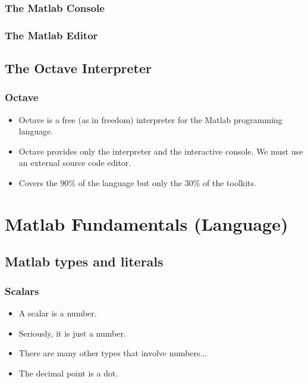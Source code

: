 \documentclass[12pt]{beamer}
\begin{document}
\begin{frame}
  \frametitle{The Matlab Console}


\end{frame}

\begin{frame}
  \frametitle{The Matlab Editor}

\end{frame}

\subsection{The Octave Interpreter}
\begin{frame}
  \frametitle{Octave}
  \begin{itemize}
  \item Octave is a free (as in freedom) interpreter for the Matlab
    programming language.
  \item Octave provides only the interpreter and the interactive
    console. We must use an external source code editor.
  \item Covers the 90\% of the language but only the 30\% of the
    toolkits.
  \end{itemize}

\end{frame}

\section{Matlab Fundamentals (Language)}
\subsection{Matlab types and literals}

\begin{frame}
  \frametitle{Scalars}
  \begin{itemize}
  \item A scalar is a number.
    \pause
  \item Seriously, it is just a number.
  \item There are many other types that involve numbers...
  \item The decimal point is a dot.
  \end{itemize}
  \testcode
\end{frame}
\end{document}
